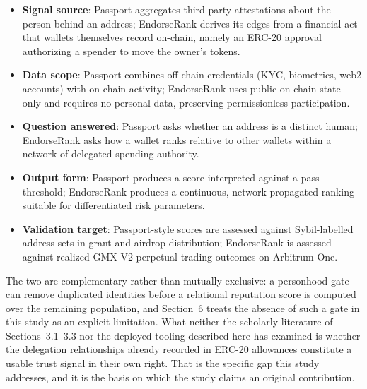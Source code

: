\begin{itemize}
\item[\textbullet] \textbf{Signal source}: Passport aggregates third-party attestations about the person behind an address; EndorseRank derives its edges from a financial act that wallets themselves record on-chain, namely an ERC-20 approval authorizing a spender to move the owner's tokens.
\item[\textbullet] \textbf{Data scope}: Passport combines off-chain credentials (KYC, biometrics, web2 accounts) with on-chain activity; EndorseRank uses public on-chain state only and requires no personal data, preserving permissionless participation.
\item[\textbullet] \textbf{Question answered}: Passport asks whether an address is a distinct human; EndorseRank asks how a wallet ranks relative to other wallets within a network of delegated spending authority.
\item[\textbullet] \textbf{Output form}: Passport produces a score interpreted against a pass threshold; EndorseRank produces a continuous, network-propagated ranking suitable for differentiated risk parameters.
\item[\textbullet] \textbf{Validation target}: Passport-style scores are assessed against Sybil-labelled address sets in grant and airdrop distribution; EndorseRank is assessed against realized GMX V2 perpetual trading outcomes on Arbitrum One.
\end{itemize}
The two are complementary rather than mutually exclusive: a personhood gate can remove duplicated identities before a relational reputation score is computed over the remaining population, and Section~6 treats the absence of such a gate in this study as an explicit limitation. What neither the scholarly literature of Sections~3.1--3.3 nor the deployed tooling described here has examined is whether the delegation relationships already recorded in ERC-20 allowances constitute a usable trust signal in their own right. That is the specific gap this study addresses, and it is the basis on which the study claims an original contribution.


